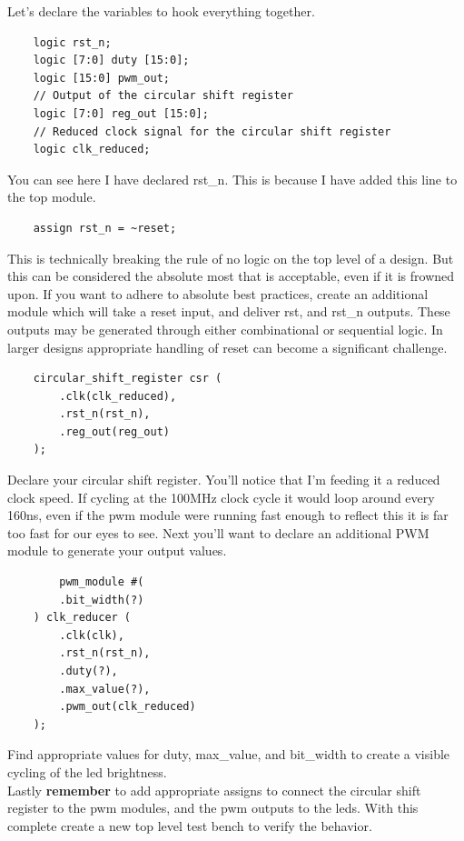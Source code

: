 Let's declare the variables to hook everything together.
\begin{verbatim}
    logic rst_n;
    logic [7:0] duty [15:0];
    logic [15:0] pwm_out;
    // Output of the circular shift register
    logic [7:0] reg_out [15:0]; 
    // Reduced clock signal for the circular shift register
    logic clk_reduced; 
\end{verbatim}

You can see here I have declared rst\_n. This is because I have added this line to the top module.
\begin{verbatim}
    assign rst_n = ~reset;
\end{verbatim}
This is technically breaking the rule of no logic on the top level of a design. But this can be considered the absolute most that is acceptable, even if it is frowned upon. If you want to adhere to absolute best practices, create an additional module which will take a reset input, and deliver rst, and rst\_n outputs. These outputs may be generated through either combinational or sequential logic. In larger designs appropriate handling of reset can become a significant challenge. 

\begin{verbatim}
    circular_shift_register csr (
        .clk(clk_reduced),
        .rst_n(rst_n),
        .reg_out(reg_out)
    );
\end{verbatim}

Declare your circular shift register. You'll notice that I'm feeding it a reduced clock speed. If cycling at the 100MHz clock cycle it would loop around every 160ns, even if the pwm module were running fast enough to reflect this it is far too fast for our eyes to see. Next you'll want to declare an additional PWM module to generate your output values. 

\begin{verbatim}
        pwm_module #(
        .bit_width(?) 
    ) clk_reducer (
        .clk(clk),
        .rst_n(rst_n),
        .duty(?), 
        .max_value(?),
        .pwm_out(clk_reduced)
    );
\end{verbatim}

Find appropriate values for duty, max\_value, and bit\_width to create a visible cycling of the led brightness.\\
\vspace{1cm}
Lastly \textbf{remember} to add appropriate assigns to connect the circular shift register to the pwm modules, and the pwm outputs to the leds. With this complete create a new top level test bench to verify the behavior. 

